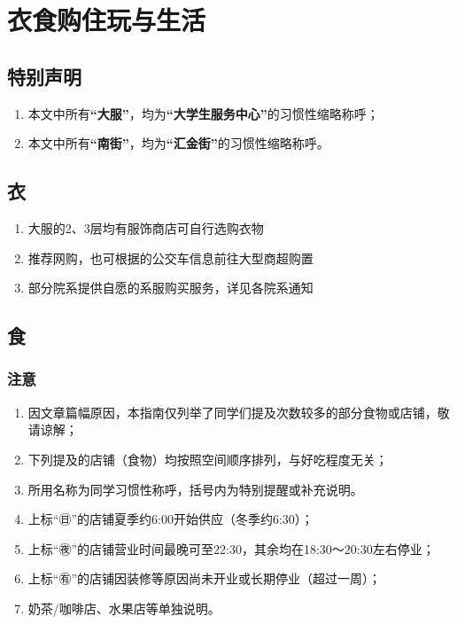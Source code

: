\section[衣食购住玩与生活]{衣食购住玩与生活}

\subsection*{特别声明}
\begin{enumerate}
    \item 本文中所有\textbf{“大服”}，均为\textbf{“大学生服务中心”}的习惯性缩略称呼；
    \item 本文中所有\textbf{“南街”}，均为\textbf{“汇金街”}的习惯性缩略称呼。
\end{enumerate}
\subsection[衣]{衣}
\begin{enumerate}
    \item 大服的2、3层均有服饰商店可自行选购衣物
    \item 推荐网购，也可根据的公交车信息前往大型商超购置
    \item 部分院系提供自愿的系服购买服务，详见各院系通知
\end{enumerate}

\subsection[食]{食}
\subsubsection*{注意}
\begin{enumerate}
    \item 因文章篇幅原因，本指南仅列举了同学们提及次数较多的部分食物或店铺，敬请谅解；
    \item 下列提及的店铺（食物）均按照空间顺序排列，与好吃程度无关；
    \item 所用名称为同学习惯性称呼，括号内为特别提醒或补充说明。
    \item 上标“㊐”的店铺夏季约6:00开始供应（冬季约6:30）；
    \item 上标“㊰”的店铺营业时间最晚可至22:30，其余均在18:30～20:30左右停业；
    \item 上标“㊒”的店铺因装修等原因尚未开业或长期停业（超过一周）；
    \item 奶茶/咖啡店、水果店等单独说明。
\end{enumerate}

